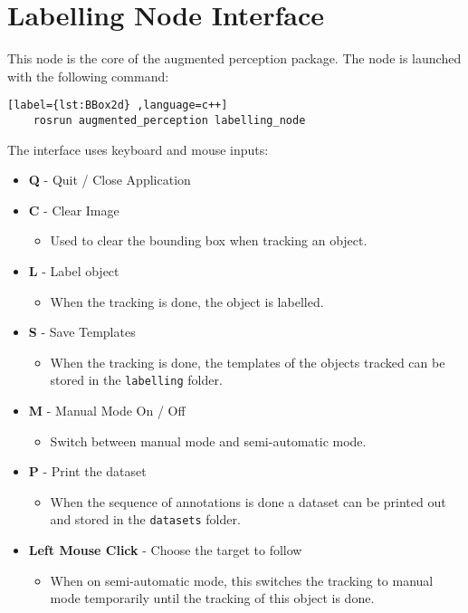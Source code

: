 \section{Labelling Node Interface}

This node is the core of the augmented perception package. The node is launched with the following command:

\begin{center}
	\begin{lstlisting}[label={lst:BBox2d} ,language=c++]
	rosrun augmented_perception labelling_node\end{lstlisting}
\end{center}

The interface uses keyboard and mouse inputs:

\begin{itemize}
	\item \textbf{Q} - Quit / Close Application
	\item \textbf{C} - Clear Image
	\begin{itemize}
		\item Used to clear the bounding box when tracking an object.
	\end{itemize}
	\item \textbf{L} - Label object
	\begin{itemize}
		\item When the tracking is done, the object is labelled.
	\end{itemize}
	\item \textbf{S} - Save Templates
	\begin{itemize}
		\item When the tracking is done, the templates of the objects tracked can be stored in the \texttt{labelling} folder.
	\end{itemize}
	\item \textbf{M} - Manual Mode On / Off
	\begin{itemize}
		\item Switch between manual mode and semi-automatic mode.
	\end{itemize}
	\item \textbf{P} - Print the dataset
	\begin{itemize}
		\item When the sequence of annotations is done a dataset can be printed out and stored in the \texttt{datasets} folder.
	\end{itemize}
	\item \textbf{Left Mouse Click} - Choose the target to follow
	\begin{itemize}
		\item When on semi-automatic mode, this switches the tracking to manual mode temporarily until the tracking of this object is done.
	\end{itemize}
\end{itemize}


